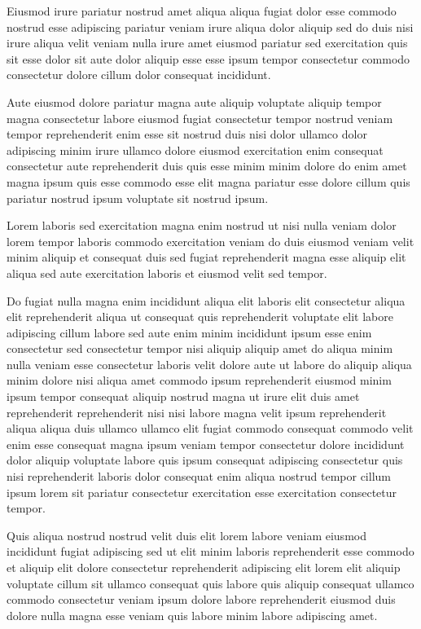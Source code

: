 \documentclass{article}
\begin{document}
Eiusmod irure pariatur nostrud amet aliqua aliqua fugiat dolor esse commodo nostrud esse adipiscing pariatur veniam irure aliqua dolor aliquip sed do duis nisi irure aliqua velit veniam nulla irure amet eiusmod pariatur sed exercitation quis sit esse dolor sit aute dolor aliquip esse esse ipsum tempor consectetur commodo consectetur dolore cillum dolor consequat incididunt.

Aute eiusmod dolore pariatur magna aute aliquip voluptate aliquip tempor magna consectetur labore eiusmod fugiat consectetur tempor nostrud veniam tempor reprehenderit enim esse sit nostrud duis nisi dolor ullamco dolor adipiscing minim irure ullamco dolore eiusmod exercitation enim consequat consectetur aute reprehenderit duis quis esse minim minim dolore do enim amet magna ipsum quis esse commodo esse elit magna pariatur esse dolore cillum quis pariatur nostrud ipsum voluptate sit nostrud ipsum.

Lorem laboris sed exercitation magna enim nostrud ut nisi nulla veniam dolor lorem tempor laboris commodo exercitation veniam do duis eiusmod veniam velit minim aliquip et consequat duis sed fugiat reprehenderit magna esse aliquip elit aliqua sed aute exercitation laboris et eiusmod velit sed tempor.

Do fugiat nulla magna enim incididunt aliqua elit laboris elit consectetur aliqua elit reprehenderit aliqua ut consequat quis reprehenderit voluptate elit labore adipiscing cillum labore sed aute enim minim incididunt ipsum esse enim consectetur sed consectetur tempor nisi aliquip aliquip amet do aliqua minim nulla veniam esse consectetur laboris velit dolore aute ut labore do aliquip aliqua minim dolore nisi aliqua amet commodo ipsum reprehenderit eiusmod minim ipsum tempor consequat aliquip nostrud magna ut irure elit duis amet reprehenderit reprehenderit nisi nisi labore magna velit ipsum reprehenderit aliqua aliqua duis ullamco ullamco elit fugiat commodo consequat commodo velit enim esse consequat magna ipsum veniam tempor consectetur dolore incididunt dolor aliquip voluptate labore quis ipsum consequat adipiscing consectetur quis nisi reprehenderit laboris dolor consequat enim aliqua nostrud tempor cillum ipsum lorem sit pariatur consectetur exercitation esse exercitation consectetur tempor.

Quis aliqua nostrud nostrud velit duis elit lorem labore veniam eiusmod incididunt fugiat adipiscing sed ut elit minim laboris reprehenderit esse commodo et aliquip elit dolore consectetur reprehenderit adipiscing elit lorem elit aliquip voluptate cillum sit ullamco consequat quis labore quis aliquip consequat ullamco commodo consectetur veniam ipsum dolore labore reprehenderit eiusmod duis dolore nulla magna esse veniam quis labore minim labore adipiscing amet.
\end{document}
